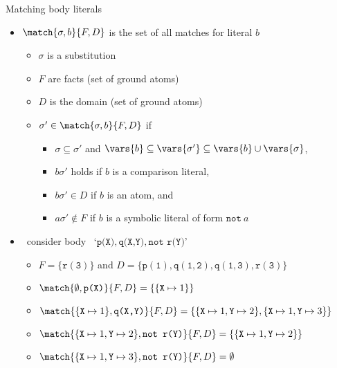 \begin{frame}{Matching body literals}
  \begin{itemize}
  \item \(\match{\sigma,b}{F,D}\) is the set of \alert{all matches for literal} \(b\)
    \begin{itemize}
    \item \(\sigma\) is a substitution
    \item \(F\) are facts (set of ground atoms)
    \item \(D\) is the domain (set of ground atoms)
    \item \(\sigma' \in \match{\sigma,b}{F,D}\) if
      \begin{itemize}\small
      \item \(\sigma \subseteq \sigma'\) and \(\vars{b} \subseteq \vars{\sigma'} \subseteq \vars{b} \cup \vars{\sigma}\),
      \item \(b\sigma'\) holds if \(b\) is a comparison literal,
      \item \(b\sigma' \in D\) if \(b\) is an atom, and
      \item \(a\sigma' \not\in F\) if \(b\) is a symbolic literal of form \(\texttt{not}\ a\)
      \end{itemize}
    \end{itemize}
    \medskip
  \item<2->  \ consider body \ `\(\texttt{p(X)},\texttt{q(X,Y)},\texttt{not r(Y)}\)'
    \begin{itemize}
    \item \(F = \{\mathtt{r(3)}\}\) and \(D = \{\mathtt{p(1)}, \mathtt{q(1,2)}, \mathtt{q(1,3)}, \mathtt{r(3)}\}\)
    \item \(\match{\emptyset, \texttt{p(X)}}{F,D} = \{ \{ \mathtt{X} \mapsto 1 \} \}\)
    \item \(\match{\{\mathtt{X} \mapsto 1\}, \texttt{q(X,Y)}}{F,D} = \{ \{ \mathtt{X} \mapsto 1, \mathtt{Y} \mapsto 2 \}, \{ \mathtt{X} \mapsto 1, \mathtt{Y} \mapsto 3 \} \}\)
    \item \(\match{\{\mathtt{X} \mapsto 1, \mathtt{Y} \mapsto 2 \}, \texttt{not r(Y)}}{F,D} = \{ \{ \mathtt{X} \mapsto 1, \mathtt{Y} \mapsto 2 \} \}\)
    \item \(\match{\{\mathtt{X} \mapsto 1, \mathtt{Y} \mapsto 3 \}, \texttt{not r(Y)}}{F,D} = \emptyset\)
    \end{itemize}
  \end{itemize}
\end{frame}
